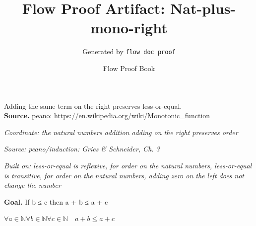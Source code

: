 \documentclass[11pt]{article}
\title{Flow Proof Artifact: Nat-plus-mono-right}
\author{Generated by \texttt{flow doc proof}}
\date{Flow Proof Book}
\theoremstyle{definition}
\begin{document}
\maketitle
Adding the same term on the right preserves less-or-equal.\\[0.5em]
\textbf{Source.} peano: https://en.wikipedia.org/wiki/Monotonic\_function\\[0.5em]
\bigskip
{}\par
\smallskip\noindent\textit{Coordinate: the natural numbers \cdot addition \cdot adding on the right preserves order}\par
\smallskip\noindent\textit{Source: peano/induction: Gries \& Schneider, Ch. 3}\par
\smallskip\noindent\textit{Built on: less-or-equal is reflexive, for order on the natural numbers, less-or-equal is transitive, for order on the natural numbers, adding zero on the left does not change the number}\par
\medskip
\noindent\textbf{Goal.} If b ≤ c then a + b ≤ a + c\par
\noindent$\displaystyle \forall a \in \mathbb{N} \forall b \in \mathbb{N} \forall c \in \mathbb{N}\quad a + b \le a + c$\par
\medskip
\noindent
\end{document}
